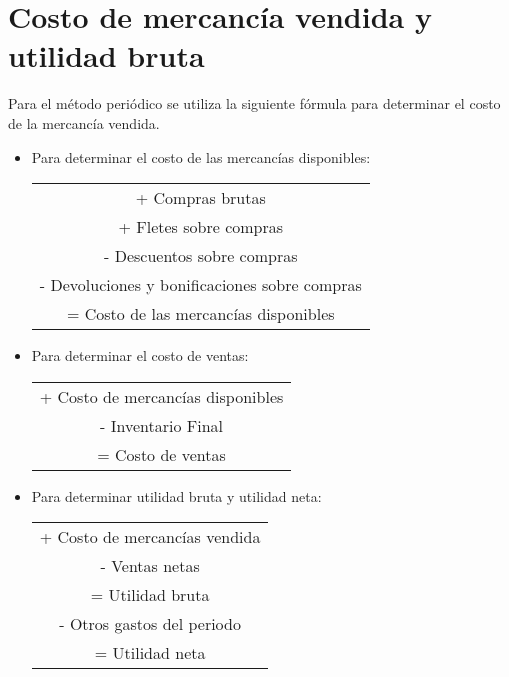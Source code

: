 \documentclass{article}
\begin{document}
\section{Costo de mercancía vendida y utilidad bruta}
Para el método periódico se utiliza la siguiente fórmula para determinar el costo de la mercancía vendida.
\begin{itemize}
\item Para determinar el costo de las mercancías disponibles: \newline 
\begin{tabular}{ | c |}
\hline
+ Compras brutas \\
+ Fletes sobre compras \\ 
- Descuentos sobre compras \\ 
- Devoluciones y bonificaciones sobre compras  \\  
\hline
= Costo de las mercancías disponibles\\ 
\hline
\end{tabular}

\item Para determinar el costo de ventas: \newline 
\begin{tabular}{ | c |}
\hline
+ Costo de mercancías disponibles\\
- Inventario Final \\
\hline  
= Costo de ventas \\ 
\hline
\end{tabular}

\item Para determinar utilidad bruta y utilidad neta: \newline 
\begin{tabular}{ | c |}
\hline
 + Costo de mercancías vendida\\
 - Ventas netas \\ 
\hline 
= Utilidad bruta \\  
- Otros gastos del periodo \\ 
\hline
= Utilidad neta \\ 
\hline
\end{tabular}

\end{itemize}
\end{document}
